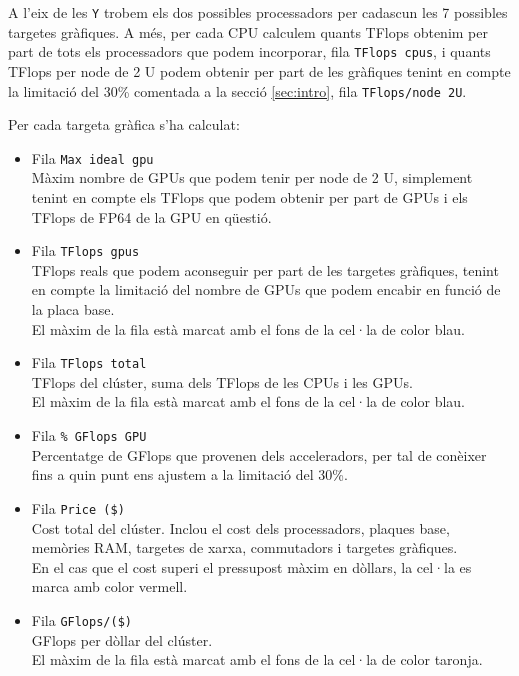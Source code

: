 A l'eix de les \texttt{Y} trobem els dos possibles processadors per cadascun les 7 possibles targetes gràfiques. A més, per cada CPU calculem quants TFlops obtenim per part de tots els processadors que podem incorporar, fila \texttt{TFlops cpus}, i quants TFlops per node de 2 U podem obtenir per part de les gràfiques tenint en compte la limitació del 30\% comentada a la secció \ref{sec:intro}, fila \texttt{TFlops/node 2U}.

Per cada targeta gràfica s'ha calculat:
\begin{itemize}
    \item Fila \texttt{Max ideal gpu}\\
        Màxim nombre de GPUs que podem tenir per node de 2 U, simplement tenint en compte els TFlops que podem obtenir per part de GPUs i els TFlops de FP64 de la GPU en qüestió.

    \item Fila \texttt{TFlops gpus}\\
        TFlops reals que podem aconseguir per part de les targetes gràfiques, tenint en compte la limitació del nombre de GPUs que podem encabir en funció de la placa base.\\
        El màxim de la fila està marcat amb el fons de la cel·la de color blau.
        
    \item Fila \texttt{TFlops total}\\
        TFlops del clúster, suma dels TFlops de les CPUs i les GPUs. \\
        El màxim de la fila està marcat amb el fons de la cel·la de color blau.

    \item Fila \texttt{\% GFlops GPU}\\
        Percentatge de GFlops que provenen dels acceleradors, per tal de conèixer fins a quin punt ens ajustem a la limitació del 30\%.

    \item Fila \texttt{Price (\$)}\\
        Cost total del clúster. Inclou el cost dels processadors, plaques base, memòries RAM, targetes de xarxa, commutadors i targetes gràfiques. \\
        En el cas que el cost superi el pressupost màxim en dòllars, la cel·la es marca amb color vermell.

    \item Fila \texttt{GFlops/(\$)}\\
        GFlops per dòllar del clúster.\\
        El màxim de la fila està marcat amb el fons de la cel·la de color taronja.
\end{itemize}
